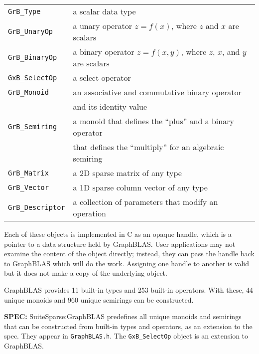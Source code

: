 \documentclass[12pt]{article}
\begin{document}
\vspace{0.1in}
\noindent
{\small
\begin{tabular}{ll}
\hline
\verb'GrB_Type'     & a scalar data type \\
\verb'GrB_UnaryOp'  & a unary operator $z=f(x)$,
                        where $z$ and $x$ are scalars\\
\verb'GrB_BinaryOp' & a binary operator $z=f(x,y)$,
                        where $z$, $x$, and $y$ are scalars\\
\verb'GxB_SelectOp' & a select operator \\
\verb'GrB_Monoid'   & an associative and commutative binary operator  \\
                    & and its identity value \\
\verb'GrB_Semiring' & a monoid that defines the ``plus'' and a binary operator\\
                    & that defines the ``multiply'' for an algebraic semiring \\
\verb'GrB_Matrix'   & a 2D sparse matrix of any type \\
\verb'GrB_Vector'   & a 1D sparse column vector of any type \\
\verb'GrB_Descriptor'& a collection of parameters that modify an operation \\
\hline
\end{tabular}
}
\vspace{0.1in}

Each of these objects is implemented in C as an opaque handle, which is a
pointer to a data structure held by GraphBLAS.  User applications may not
examine the content of the object directly; instead, they can pass the handle
back to GraphBLAS which will do the work.  Assigning one handle to another
is valid but it does not make a copy of the underlying object.

GraphBLAS provides 11 built-in types and 253 built-in operators.  With these,
44 unique monoids and 960 unique semirings can be constructed.

\begin{spec}
{\bf SPEC:} SuiteSparse:GraphBLAS predefines all unique monoids and semirings that can be constructed from built-in types and operators, as an extension to the spec.  They appear in \verb'GraphBLAS.h'.
The \verb'GxB_SelectOp' object is an extension to GraphBLAS.
\end{spec}

\newpage
\end{document}
